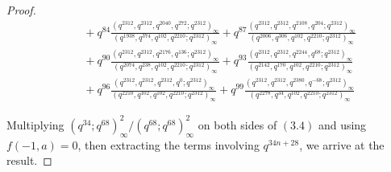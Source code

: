 \documentclass[10pt,a4paper]{amsart}
\begin{document}
\begin{proof}
\[\begin{aligned}
			&\quad + q^{84}\frac{(q^{2312}, q^{2312}, q^{2040}, q^{272}; q^{2312})_{\infty}}
			{(q^{1938}, q^{374}, q^{102}, q^{2210}; q^{2312})_{\infty}}
			+ q^{87}\frac{(q^{2312}, q^{2312}, q^{2108}, q^{204}; q^{2312})_{\infty}}
			{(q^{2006}, q^{306}, q^{102}, q^{2210}; q^{2312})_{\infty}} \\
			&\quad + q^{90}\frac{(q^{2312}, q^{2312}, q^{2176}, q^{136}; q^{2312})_{\infty}}
			{(q^{2074}, q^{238}, q^{102}, q^{2210}; q^{2312})_{\infty}}
			+ q^{93}\frac{(q^{2312}, q^{2312}, q^{2244}, q^{68}; q^{2312})_{\infty}}
			{(q^{2142}, q^{170}, q^{102}, q^{2210}; q^{2312})_{\infty}} \\
			&\quad +  q^{96}\frac{(q^{2312}, q^{2312}, q^{2312}, q^{0}; q^{2312})_{\infty}}
			{(q^{2210}, q^{102}, q^{102}, q^{2210}; q^{2312})_{\infty}}
			+ q^{99}\frac{(q^{2312}, q^{2312}, q^{2380}, q^{-68}; q^{2312})_{\infty}}
			{(q^{2278}, q^{34}, q^{102}, q^{2210}; q^{2312})_{\infty}} 
		\end{aligned}
		\tag{3.4}
		\]
		
		Multiplying ${(q^{34}; q^{68})_{\infty}^{2}}/{(q^{68}; q^{68})_{\infty}^{2}}$ on both sides of $(3.4)$ and using $f(-1, a)=0$, then extracting the terms involving $q^{34n+28}$, we arrive at the result.
	\end{proof}
\end{document}
